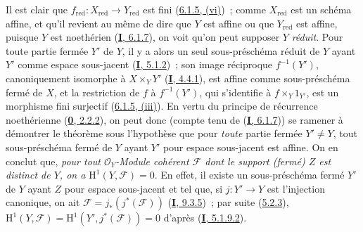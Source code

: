 Il est clair que
$f_{\mathrm{red}}:X_{\mathrm{red}}\to Y_{\mathrm{red}}$ est fini
(\hyperref[II.6.1.5-fr]{6.1.5, (vi)})~; comme $X_{\mathrm{red}}$ est un
schéma affine, et qu'il revient au même de dire que $Y$ est affine ou que
$Y_{\mathrm{red}}$ est affine, puisque $Y$ est noethérien
(\hyperref[I.6.1.7-fr]{\textbf{I}, 6.1.7}), on voit qu'on peut supposer $Y$
\emph{réduit}. Pour toute partie fermée $Y'$ de $Y$, il y a alors un seul
sous-préschéma réduit de $Y$ ayant $Y'$ comme espace sous-jacent
(\hyperref[I.5.1.2-fr]{\textbf{I}, 5.1.2})~; son image réciproque $f^{-1}(Y')$,
canoniquement isomorphe à $X\times_Y Y'$
(\hyperref[I.4.4.1-fr]{\textbf{I}, 4.4.1}), est affine comme sous-préschéma fermé de
$X$, et la restriction de $f$ à $f^{-1}(Y')$, qui s'identifie à
$f\times_Y 1_{Y'}$, est un morphisme fini surjectif
(\hyperref[II.6.1.5-fr]{6.1.5, (iii)}). En vertu du principe de récurrence
noethérienne (\hyperref[0.2.2.2-fr]{\textbf{0}, 2.2.2}), on peut donc (compte tenu de
(\hyperref[I.6.1.7-fr]{\textbf{I}, 6.1.7})) se ramener à démontrer le théorème sous
l'hypothèse que pour \emph{toute} partie fermée $Y'\neq Y$, tout
sous-préschéma fermé de $Y$ ayant $Y'$ pour espace sous-jacent est affine.
On en conclut que, \emph{pour tout $\mathcal{O}_Y$-Module cohérent
$\mathcal{F}$ dont le support (fermé) $Z$ est distinct de $Y$, on a
$\mathrm{H}^1(Y,\mathcal{F})=0$}. En effet, il existe un sous-préschéma fermé
$Y'$ de $Y$ ayant $Z$ pour espace sous-jacent et tel que, si $j:Y'\to Y$ est
l'injection canonique, on ait
$\mathcal{F}=j_*(j^*(\mathcal{F}))$
(\hyperref[I.9.3.5-fr]{\textbf{I}, 9.3.5})~; par suite
(\hyperref[II.5.2.3-fr]{5.2.3}),
$\mathrm{H}^1(Y,\mathcal{F})
=\mathrm{H}^1(Y',j^*(\mathcal{F}))=0$ d'après
(\hyperref[I.5.1.9.2-fr]{\textbf{I}, 5.1.9.2}).

